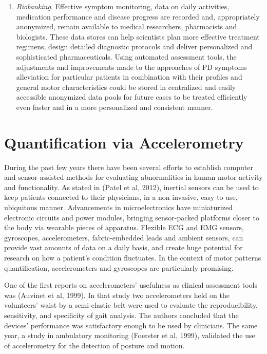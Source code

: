 \begin{enumerate}
\item \textit{Biobanking}. Effective symptom monitoring, data on daily activities, medication performance and disease progress are recorded and, appropriately anonymized, remain available to medical researchers, pharmacists and biologists. These data stores can help scientists plan more effective treatment regimens, design detailed diagnostic protocols and deliver personalized and sophisticated pharmaceuticals. Using automated assessment tools, the adjustments and improvements made to the approaches of \gls{PD} symptoms alleviation for particular patients in combination with their profiles and general motor characteristics could be stored in centralized and easily accessible anonymized data pools for future cases to be treated efficiently even faster and in a more personalized and consistent manner.
\end{enumerate}


\section{Quantification via Accelerometry}
\label{sec:accelerometry}
During the past few years there have been several efforts to establish computer and sensor-assisted methods for evaluating abnormalities in human motor activity and functionality. As stated in (Patel et al, 2012), inertial sensors can be used to keep patients connected to their physicians, in a non invasive, easy to use, ubiquitous manner. Advancements in microelectronics have miniaturized electronic circuits and power modules, bringing sensor-packed platforms closer to the body via wearable pieces of apparatus. Flexible \gls{ECG} and \gls{EMG} sensors, gyroscopes, accelerometers, fabric-embedded leads and ambient sensors, can provide vast amounts of data on a daily basis, and create huge potential for research on how a patient's condition fluctuates. In the context of motor patterns quantification, accelerometers and gyroscopes are particularly promising. 

One of the first reports on accelerometers' usefulness as clinical assessment tools was (Auvinet et al, 1999). In that study two accelerometers held on the volunteers' waist by a semi-elastic belt were used to evaluate the reproducibility, sensitivity, and specificity of gait analysis. The authors concluded that the devices' performance was satisfactory enough to be used by clinicians. The same year, a study in ambulatory monitoring (Foerster et al, 1999), validated the use of accelerometry for the detection of posture and motion. 

